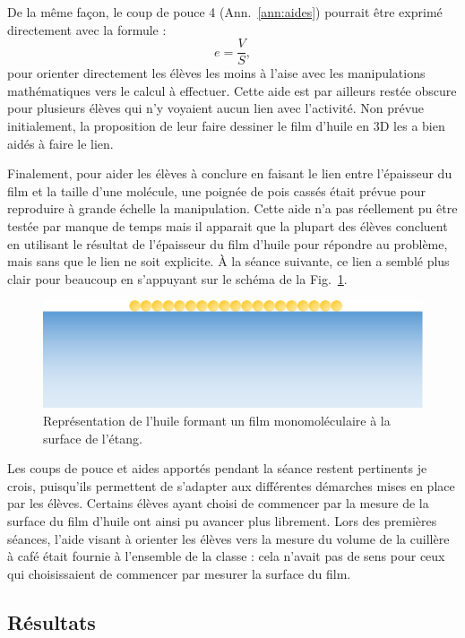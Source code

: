 \documentclass[12pt,a4paper, fleqn]{report}
\begin{document}
De la même façon, le coup de pouce 4 (Ann.~\ref{ann:aides}) pourrait être exprimé directement avec la formule :
\[e = \frac{V}{S}, \]
pour orienter directement les élèves les moins à l'aise avec les manipulations mathématiques vers le calcul à effectuer.
Cette aide est par ailleurs restée obscure pour plusieurs élèves qui n'y voyaient aucun lien avec l'activité.
Non prévue initialement, la proposition de leur faire dessiner le film d'huile en 3D les a bien aidés à faire le lien.

Finalement, pour aider les élèves à conclure en faisant le lien entre l'épaisseur du film et la taille d'une molécule, une poignée de pois cassés était prévue pour reproduire à grande échelle la manipulation.
Cette aide n'a pas réellement pu être testée par manque de temps mais il apparait que la plupart des élèves concluent en utilisant le résultat de l'épaisseur du film d'huile pour répondre au problème, mais sans que le lien ne soit explicite.
À la séance suivante, ce lien a semblé plus clair pour beaucoup en s'appuyant sur le schéma de la Fig.~\ref{fig:exp}.

\begin{figure}[htbp]
\center
\includegraphics[scale=.25]{experience.png}
\caption{Représentation de l'huile formant un film monomoléculaire à la surface de l'étang.}
\label{fig:exp}
\end{figure}

Les coups de pouce et aides apportés pendant la séance restent pertinents je crois, puisqu'ils permettent de s'adapter aux différentes démarches mises en place par les élèves.
Certains élèves ayant choisi de commencer par la mesure de la surface du film d'huile ont ainsi pu avancer plus librement.
Lors des premières séances, l'aide visant à orienter les élèves vers la mesure du volume de la cuillère à café était fournie à l'ensemble de la classe : cela n'avait pas de sens pour ceux qui choisissaient de commencer par mesurer la surface du film.

\subsection{Résultats}
\end{document}
